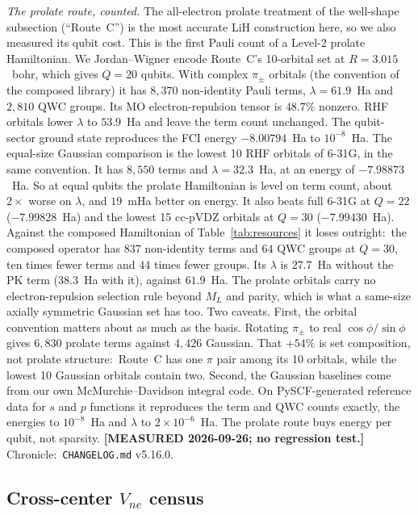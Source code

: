 \documentclass[aps,pra,twocolumn,superscriptaddress,longbibliography]{revtex4-2}
\begin{document}
\emph{The prolate route, counted.}  The all-electron prolate treatment of the
well-shape subsection (``Route~C'') is the most accurate LiH construction here,
so we also measured its qubit cost.  This is the first Pauli count of a Level-2
prolate Hamiltonian.  We Jordan--Wigner encode Route~C's 10-orbital set at
$R=3.015$~bohr, which gives $Q=20$ qubits.  With complex $\pi_\pm$ orbitals (the
convention of the composed library) it has $8{,}370$ non-identity Pauli terms,
$\lambda=61.9$~Ha and $2{,}810$ QWC groups.  Its MO electron-repulsion tensor is
$48.7\%$ nonzero.  RHF orbitals lower $\lambda$ to $53.9$~Ha and leave the
term count unchanged.  The qubit-sector ground state reproduces the FCI energy
$-8.00794$~Ha to $10^{-8}$~Ha.  The equal-size Gaussian comparison is the lowest
10 RHF orbitals of 6-31G, in the same convention.  It has $8{,}550$ terms and
$\lambda=32.3$~Ha, at an energy of $-7.98873$~Ha.  So at equal qubits the
prolate Hamiltonian is level on term count, about $2\times$ worse on $\lambda$,
and $19$~mHa better on energy.  It also beats full 6-31G at $Q=22$
($-7.99828$~Ha) and the lowest 15 cc-pVDZ orbitals at $Q=30$ ($-7.99430$~Ha).
Against the composed Hamiltonian of Table~\ref{tab:resources} it loses outright:\
the composed operator has $837$ non-identity terms and $64$ QWC groups at $Q=30$,
ten times fewer terms and $44$ times fewer groups.  Its $\lambda$ is $27.7$~Ha
without the PK term ($38.3$~Ha with it), against $61.9$~Ha.  The prolate
orbitals carry no electron-repulsion selection rule beyond $M_L$ and parity,
which is what a same-size axially symmetric Gaussian set has too.  Two
caveats.  First, the orbital convention matters about as much as the basis.
Rotating $\pi_\pm$ to real $\cos\phi/\sin\phi$ gives $6{,}830$ prolate terms
against $4{,}426$ Gaussian.  That $+54\%$ is set composition, not prolate
structure:\ Route~C has one $\pi$ pair among its 10 orbitals, while the lowest
10 Gaussian orbitals contain two.  Second, the Gaussian baselines come from our
own McMurchie--Davidson integral code.  On PySCF-generated reference data for
$s$ and $p$ functions it reproduces the term and QWC counts exactly, the
energies to $10^{-8}$~Ha and $\lambda$ to $2\times10^{-6}$~Ha.  The prolate route buys energy per qubit, not sparsity.
\textbf{[MEASURED 2026-09-26; no regression test.]}  Chronicle:\
\texttt{CHANGELOG.md} v5.16.0.

\subsection{Cross-center $V_{ne}$ census}
\end{document}
